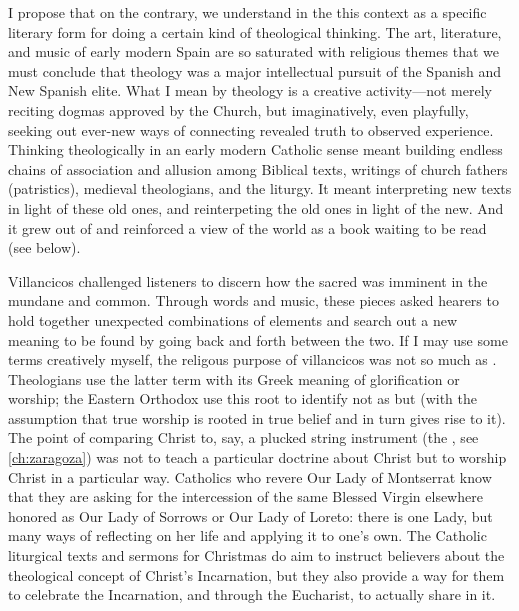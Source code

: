 I propose that on the contrary, we understand  in the this
context as a specific literary form for doing a certain kind of theological
thinking.
The art, literature, and music of early modern Spain are so saturated with
religious themes that we must conclude that theology was a major intellectual
pursuit of the Spanish and New Spanish elite.
What I mean by theology is a creative activity---not merely reciting dogmas
approved by the Church, but imaginatively, even playfully, seeking out ever-new
ways of connecting revealed truth to observed experience.
Thinking theologically in an early modern Catholic sense meant building 
endless chains of association and allusion among Biblical texts, writings of
church fathers (patristics), medieval theologians, and the liturgy. 
It meant interpreting new texts in light of these old ones, and reinterpeting
the old ones in light of the new.
And it grew out of and reinforced a view of the world as a book waiting to be
read (see below).

Villancicos challenged listeners to discern how the sacred was imminent in the
mundane and common.%
Through words and music, these pieces asked hearers to hold together unexpected
combinations of elements and search out a new meaning to be found by going back
and forth between the two.
If I may use some terms creatively myself, the religous purpose of villancicos
was not so much  as .
Theologians use the latter term with its Greek meaning of glorification or
worship; the Eastern Orthodox use this root to identify not as  but  (with the assumption that true worship
is rooted in true belief and in turn gives rise to it).%
The point of comparing Christ to, say, a plucked string instrument (the
, see \cref{ch:zaragoza}) was not to teach a particular
doctrine about Christ but to worship Christ in a particular way.
Catholics who revere Our Lady of Montserrat know that they are asking for the
intercession of the same Blessed Virgin elsewhere honored as Our Lady of
Sorrows or Our Lady of Loreto: there is one Lady, but many ways of reflecting
on her life and applying it to one's own.%
    \citXXX[Johnson?]
The Catholic liturgical texts and sermons for Christmas do aim to instruct
believers about the theological concept of Christ's Incarnation, but they also
provide a way for them to celebrate the Incarnation, and through the Eucharist,
to actually share in it.

